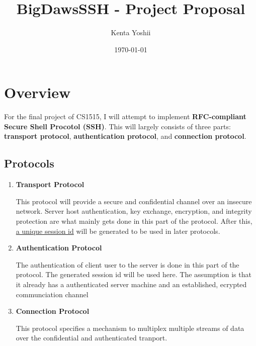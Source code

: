 \documentclass{article} %
\title{BigDawsSSH - Project Proposal}
\author{Kenta Yoshii}
\date{\today} %
\begin{document}
\maketitle %

\section{Overview} %
For the final project of CS1515, I will attempt to implement \textbf{RFC-compliant Secure Shell Procotol (SSH)}. This will largely consists of three parts: \textbf{transport protocol}, \textbf{authentication protocol}, and \textbf{connection protocol}.
\subsection{Protocols}
\begin{enumerate}
    \item \textbf{Transport Protocol}
    
    This protocol will provide a secure and confidential channel over an insecure network. Server host authentication, key exchange, encryption, and integrity protection are what mainly gets done in this part of the protocol. After this, \underline{a unique session id} will be generated to be used in later protocols. 
    \item \textbf{Authentication Protocol}
    
    The authentication of client user to the server is done in this part of the protocol. The generated session id will be used here. The assumption is that it already has a authenticated server machine and an established, ecrypted communciation channel
    \item \textbf{Connection Protocol}
    
    This protocol specifies a mechanism to multiplex multiple streams of data over the confidential and authenticated tranport.
\end{enumerate}
\end{document}
